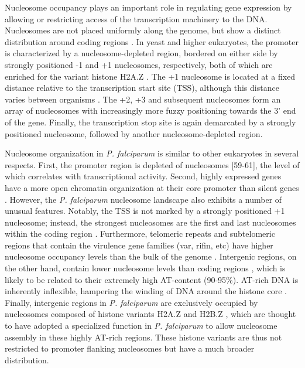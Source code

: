 Nucleosome occupancy plays an important role in regulating gene expression by
allowing or restricting access of the transcription machinery to the DNA.
Nucleosomes are not placed uniformly along the genome, but show a distinct
distribution around coding regions \citep{brogaard:map,
buenrostro:quantitative, jansen:nucleosome, lee:high-resolution,
mavrich:nucleosome}. In yeast and higher eukaryotes,
the promoter is characterized by a nucleosome-depleted region, bordered on
either side by strongly positioned -1 and +1 nucleosomes, respectively, both
of which are enriched for the variant histone H2A.Z
\citep{raisner:histone, guillemette:variant, tolstorukov:comparative}. The +1 nucleosome
is located at a fixed distance relative to the transcription start site (TSS),
although this distance varies between organisms \citep{lee:high-resolution}. The +2, +3 and
subsequent nucleosomes form an array of nucleosomes with increasingly more
fuzzy positioning towards the 3’ end of the gene. Finally, the transcription
stop site is again demarcated by a strongly positioned nucleosome, followed by
another nucleosome-depleted region.

Nucleosome organization in \textit{P. falciparum} is similar to other eukaryotes in
several respects. First, the promoter region is depleted of nucleosomes
\citep{bunnik:DNA-encoded, ponts:nucleosome, westenberger:genome-wide}
[59-61], the level of which correlates with transcriptional activity. Second,
highly expressed genes have a more open chromatin organization at their core
promoter than silent genes \citep{bunnik:DNA-encoded, ponts:nucleosome}.
However, the \textit{P. falciparum} nucleosome
landscape also exhibits a number of unusual features. Notably, the TSS is not
marked by a strongly positioned +1 nucleosome; instead, the strongest
nucleosomes are the first and last nucleosomes within the coding region
\citep{bunnik:DNA-encoded, ponts:nucleosome}. Furthermore,
telomeric repeats and subtelomeric regions that contain
the virulence gene families (var, rifin, etc) have higher nucleosome occupancy
levels than the bulk of the genome \citep{bunnik:DNA-encoded,
ponts:nucleosome, segal:genomic}. Intergenic regions, on the
other hand, contain lower nucleosome levels than coding regions
\citep{bunnik:DNA-encoded, ponts:nucleosome, segal:genomic, ponts:nucleosome2},
which is likely to be related to their extremely high AT-content (90-95\%).
AT-rich DNA is inherently inflexible, hampering the winding of DNA around the
histone core \citep{tillo:GC, segal:poly}. 
Finally, intergenic regions in \textit{P. falciparum} are
exclusively occupied by nucleosomes composed of histone variants H2A.Z and
H2B.Z \citep{hoeijmakers:h2az, petter:h2az}, 
which are thought to have adopted a specialized function in \textit{P.
falciparum} to allow nucleosome assembly in these highly AT-rich regions. These
histone variants are thus not restricted to promoter flanking nucleosomes but
have a much broader distribution.

